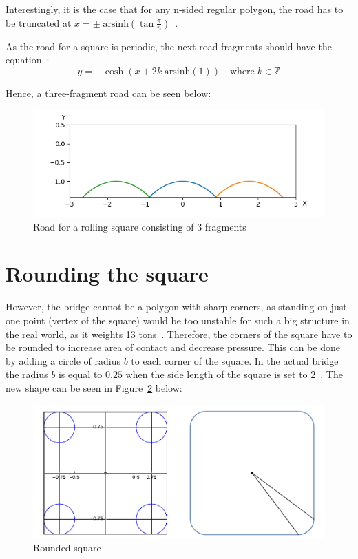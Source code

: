 \documentclass[12pt]{article}
\begin{document}
        Interestingly, it is the case that for any n-sided regular polygon, the road has to be truncated at $x = \pm \; \text{arsinh}(\tan\frac{\pi}{n})$~\cite{Hall_Wagon_1992}.
        
        As the road for a square is periodic, the next road fragments should have the equation~\cite{Hall_Wagon_1992}:
        \begin{equation}
            y = - \cosh (x + 2k \;\text{arsinh}(1) ) \quad \text{where}\; k \in \mathbb{Z}
        \end{equation}
        
        Hence, a three-fragment road can be seen below:
        \begin{figure}[H]
            \centering
            \includegraphics[width=\linewidth]{images/road_3.png}
            \caption{Road for a rolling square consisting of 3 fragments}\label{fig:road3}
        \end{figure}

    \section{Rounding the square}

        However, the bridge cannot be a polygon with sharp corners, as standing on just one point (vertex of the square) would be too unstable for such a big structure in the real world, as it weights 13 tons~\cite{bridge_newatlas}. Therefore, the corners of the square have to be rounded to increase area of contact and decrease pressure. This can be done by adding a circle of radius $b$ to each corner of the square. In the actual bridge the radius $b$ is equal to $0.25$ when the side length of the square is set to $2$~\cite{bridge_wolfram}. The new shape can be seen in Figure~\ref{fig:rounded_square} below:

        \begin{figure}[H]
            \centering
            \includegraphics[width=0.9\linewidth]{images/rounded_square.png}
            \caption{Rounded square~\cite{bridge_wolfram}}\label{fig:rounded_square}
        \end{figure}
\end{document}
